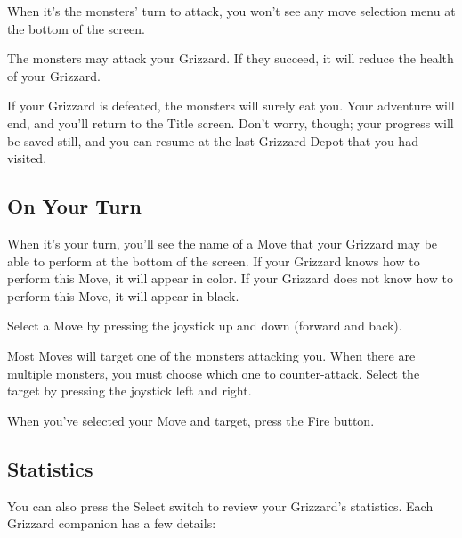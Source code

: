 \documentclass[12pt,twoside,openright,book]{memoir}
\begin{document}
When it's the monsters' turn to attack, you won't see any move selection
menu at the bottom of the screen.

The monsters may  attack your Grizzard. If they succeed,  it will reduce
the health of your Grizzard.

If  your  Grizzard  is  defeated,  the monsters  will  surely  eat  you.
Your  adventure  will  end,  and  you'll return  to  the  Title  screen.
Don't worry,  though; your  progress will  be saved  still, and  you can
resume at the last Grizzard Depot that you had visited.

\subsection{On Your Turn}

When it's your turn, you'll see the name of a Move that your Grizzard may be
able to perform at the bottom of the screen. If your Grizzard knows how to
perform this Move, it will appear in color. If your Grizzard does not know
how to perform this Move, it will appear in black.

Select a Move by pressing the joystick up and down (forward and back).

Most Moves will target one of the monsters attacking you. When there are
multiple monsters, you must choose which one to counter-attack. Select the
target by pressing the joystick left and right.

When you've selected your Move and target, press the Fire button.

\subsection{Statistics}

You can also press the Select switch to review your Grizzard's statistics.
Each Grizzard companion has a few details:
\end{document}
